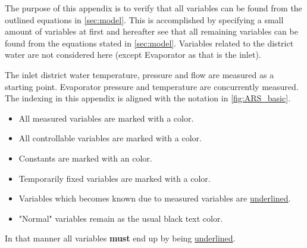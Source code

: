 The purpose of this appendix is to verify that all variables can be found from the outlined equations in \autoref{sec:model}. This is accomplished by specifying a small amount of variables at first and hereafter see that all remaining variables can be found from the equations stated in \autoref{sec:model}. Variables related to the district water are not considered here (except Evaporator as that is the inlet).

The inlet district water temperature, pressure and flow are measured as a starting point. Evaporator pressure and temperature are concurrently measured. The indexing in this appendix is aligned with the notation in \autoref{fig:ARS_basic}.
\begin{itemize}
\item All measured variables are marked with a {\color{MidnightBlue}{faded blue}} color.
\item All controllable variables are marked with a {\color{Chocolate}{brown}} color.
\item Constants are marked with an {\color{OliveGreen}{green}} color.
\item Temporarily fixed variables are marked with a {\color{WildStrawberry}{light red}} color.
\item Variables which becomes known due to measured variables are \underline{underlined}.
\item "Normal" variables remain as the usual black text color.
\end{itemize}
In that manner all variables \textbf{must} end up by being \underline{underlined}. 


